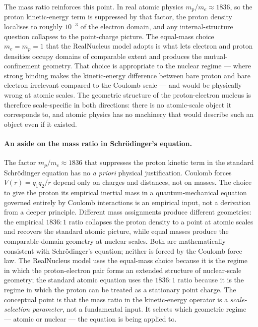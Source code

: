 \documentclass[11pt]{article}
\begin{document}
The mass ratio reinforces this point. In real atomic physics $m_p/m_e \approx 1836$, so the proton kinetic-energy term is suppressed by that factor, the proton density localises to roughly $10^{-3}$ of the electron domain, and any internal-structure question collapses to the point-charge picture. The equal-mass choice $m_e = m_p = 1$ that the RealNucleus model adopts is what lets electron and proton densities occupy domains of comparable extent and produces the mutual-confinement geometry. That choice is appropriate to the nuclear regime --- where strong binding makes the kinetic-energy difference between bare proton and bare electron irrelevant compared to the Coulomb scale --- and would be physically wrong at atomic scales. The geometric structure of the proton-electron nucleus is therefore scale-specific in both directions: there is no atomic-scale object it corresponds to, and atomic physics has no machinery that would describe such an object even if it existed.

\paragraph{An aside on the mass ratio in Schr\"odinger's equation.}
The factor $m_p/m_e \approx 1836$ that suppresses the proton kinetic term in the standard Schr\"odinger equation has no \emph{a priori} physical justification. Coulomb forces $V(r) = q_1 q_2 / r$ depend only on charges and distances, not on masses. The choice to give the proton its empirical inertial mass in a quantum-mechanical equation governed entirely by Coulomb interactions is an empirical input, not a derivation from a deeper principle. Different mass assignments produce different geometries: the empirical $1836:1$ ratio collapses the proton density to a point at atomic scales and recovers the standard atomic picture, while equal masses produce the comparable-domain geometry at nuclear scales. Both are mathematically consistent with Schr\"odinger's equation; neither is forced by the Coulomb force law. The RealNucleus model uses the equal-mass choice because it is the regime in which the proton-electron pair forms an extended structure of nuclear-scale geometry; the standard atomic equation uses the $1836:1$ ratio because it is the regime in which the proton can be treated as a stationary point charge. The conceptual point is that the mass ratio in the kinetic-energy operator is a \emph{scale-selection parameter}, not a fundamental input. It selects which geometric regime --- atomic or nuclear --- the equation is being applied to.
\end{document}
